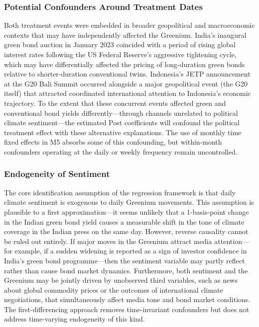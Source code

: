 \documentclass[12pt,a4paper]{article}
\begin{document}
\subsubsection{Potential Confounders Around Treatment Dates}

Both treatment events were embedded in broader geopolitical and macroeconomic contexts that may have independently affected the Greenium. India's inaugural green bond auction in January 2023 coincided with a period of rising global interest rates following the US Federal Reserve's aggressive tightening cycle, which may have differentially affected the pricing of long-duration green bonds relative to shorter-duration conventional twins. Indonesia's JETP announcement at the G20 Bali Summit occurred alongside a major geopolitical event (the G20 itself) that attracted coordinated international attention to Indonesia's economic trajectory. To the extent that these concurrent events affected green and conventional bond yields differently---through channels unrelated to political climate sentiment---the estimated Post coefficients will confound the political treatment effect with these alternative explanations. The use of monthly time fixed effects in M5 absorbs some of this confounding, but within-month confounders operating at the daily or weekly frequency remain uncontrolled.

\subsubsection{Endogeneity of Sentiment}

The core identification assumption of the regression framework is that daily climate sentiment is exogenous to daily Greenium movements. This assumption is plausible to a first approximation---it seems unlikely that a 1-basis-point change in the Indian green bond yield causes a measurable shift in the tone of climate coverage in the Indian press on the same day. However, reverse causality cannot be ruled out entirely. If major moves in the Greenium attract media attention---for example, if a sudden widening is reported as a sign of investor confidence in India's green bond programme---then the sentiment variable may partly reflect rather than cause bond market dynamics. Furthermore, both sentiment and the Greenium may be jointly driven by unobserved third variables, such as news about global commodity prices or the outcomes of international climate negotiations, that simultaneously affect media tone and bond market conditions. The first-differencing approach removes time-invariant confounders but does not address time-varying endogeneity of this kind.
\end{document}
